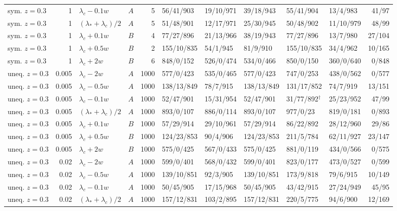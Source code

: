 \begin{longtable}{@{}lrllrlllllr@{}}
sym. $z{=}0.3$ & 1 & $\lambda_c-0.1w$ & $A$ & 5 & 56/41/903 & 19/10/971 & 39/18/943 & 55/41/904 & 13/4/983 & 41/97\\
sym. $z{=}0.3$ & 1 & $(\lambda_*+\lambda_c)/2$ & $A$ & 5 & 51/48/901 & 12/17/971 & 25/30/945 & 50/48/902 & 11/10/979 & 48/99\\
sym. $z{=}0.3$ & 1 & $\lambda_c+0.1w$ & $B$ & 4 & 77/27/896 & 21/13/966 & 38/19/943 & 77/27/896 & 13/7/980 & 27/104\\
sym. $z{=}0.3$ & 1 & $\lambda_c+0.5w$ & $B$ & 2 & 155/10/835 & 54/1/945 & 81/9/910 & 155/10/835 & 34/4/962 & 10/165\\
sym. $z{=}0.3$ & 1 & $\lambda_c+2w$ & $B$ & 6 & 848/0/152 & 526/0/474 & 534/0/466 & 850/0/150 & 360/0/640 & 0/848\\
uneq. $z{=}0.3$ & 0.005 & $\lambda_c-2w$ & $A$ & 1000 & 577/0/423 & 535/0/465 & 577/0/423 & 747/0/253 & 438/0/562 & 0/577\\
uneq. $z{=}0.3$ & 0.005 & $\lambda_c-0.5w$ & $A$ & 1000 & 138/13/849 & 78/7/915 & 138/13/849 & 131/17/852 & 74/7/919 & 13/151\\
uneq. $z{=}0.3$ & 0.005 & $\lambda_c-0.1w$ & $A$ & 1000 & 52/47/901 & 15/31/954 & 52/47/901 & 31/77/892$^\dagger$ & 25/23/952 & 47/99\\
uneq. $z{=}0.3$ & 0.005 & $(\lambda_*+\lambda_c)/2$ & $A$ & 1000 & 893/0/107 & 886/0/114 & 893/0/107 & 977/0/23 & 819/0/181 & 0/893\\
uneq. $z{=}0.3$ & 0.005 & $\lambda_c+0.1w$ & $B$ & 1000 & 57/29/914 & 29/10/961 & 57/29/914 & 86/22/892 & 28/12/960 & 29/86\\
uneq. $z{=}0.3$ & 0.005 & $\lambda_c+0.5w$ & $B$ & 1000 & 124/23/853 & 90/4/906 & 124/23/853 & 211/5/784 & 62/11/927 & 23/147\\
uneq. $z{=}0.3$ & 0.005 & $\lambda_c+2w$ & $B$ & 1000 & 575/0/425 & 567/0/433 & 575/0/425 & 881/0/119 & 434/0/566 & 0/575\\
uneq. $z{=}0.3$ & 0.02 & $\lambda_c-2w$ & $A$ & 1000 & 599/0/401 & 568/0/432 & 599/0/401 & 823/0/177 & 473/0/527 & 0/599\\
uneq. $z{=}0.3$ & 0.02 & $\lambda_c-0.5w$ & $A$ & 1000 & 139/10/851 & 92/3/905 & 139/10/851 & 173/9/818 & 79/6/915 & 10/149\\
uneq. $z{=}0.3$ & 0.02 & $\lambda_c-0.1w$ & $A$ & 1000 & 50/45/905 & 17/15/968 & 50/45/905 & 43/42/915 & 27/24/949 & 45/95\\
uneq. $z{=}0.3$ & 0.02 & $(\lambda_*+\lambda_c)/2$ & $A$ & 1000 & 157/12/831 & 103/2/895 & 157/12/831 & 220/5/775 & 94/6/900 & 12/169\\

\end{longtable}
